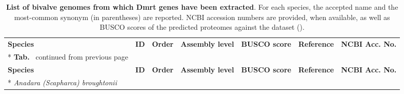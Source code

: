\begin{landscape}
	\footnotesize
	\begin{longtable}[c]{@{}lllllll@{}}
		\caption[\textbf{List of bivalve genomes from which Dmrt genes have been extracted}]
		{
			\textbf{List of bivalve genomes from which Dmrt genes have been extracted}. For each species, the accepted name and the most-common synonym (in parentheses) are reported. NCBI accession numbers are provided, when available, as well as BUSCO scores of the predicted proteomes against the  dataset ().
		}
		\label{tab:genomes}                                                                               \\
		\toprule
		\textbf{Species}                                                                                &
		\textbf{ID}                                                                                     &
		\textbf{Order}                                                                                  &
		\textbf{Assembly level}                                                                         &
		\textbf{BUSCO score}                                                                            &
		\textbf{Reference}                                                                              &
		\textbf{NCBI Acc. No.}                                                                            \\* \hline \hline
		\endfirsthead
		\multicolumn{7}{c}%
		{\textbf{Tab. \thetable}\ continued from previous page}                                       \\
		\toprule
		\textbf{Species}                                                                                &
		\textbf{ID}                                                                                     &
		\textbf{Order}                                                                                  &
		\textbf{Assembly level}                                                                         &
		\textbf{BUSCO score}                                                                            &
		\textbf{Reference}                                                                              &
		\textbf{NCBI Acc. No.}                                                                            \\* \hline \hline
		\endhead
		\endfoot
		\endlastfoot
		\textit{Anadara (Scapharca) broughtonii}                                                        &

\end{longtable}
\end{landscape}
